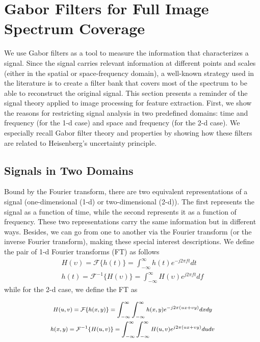 \documentclass[journal]{IEEEtran}
\begin{document}
\section{Gabor Filters for Full Image Spectrum Coverage}\label{sec:gabor_filter_description}
We use Gabor filters as a tool to measure the information that characterizes a signal. Since the signal carries relevant information at different points and scales (either in the spatial or space-frequency domain), a well-known strategy used in the literature is to create a filter bank that covers most of the spectrum to be able to reconstruct the original signal. This section presents a reminder of the signal theory applied to image processing for feature extraction. First, we show the reasons for restricting signal analysis in two predefined domains: time and frequency (for the 1-d case) and space and frequency (for the 2-d case). We especially recall Gabor filter theory and properties by showing how these filters are related to Heisenberg's uncertainty principle.

\subsection{Signals in Two Domains}
Bound by the Fourier transform, there are two equivalent representations of a signal (one-dimensional (1-d) or two-dimensional (2-d)). The first represents the signal as a function of time, while the second represents it as a function of frequency. These two representations carry the same information but in different ways. Besides, we can go from one to another via the Fourier transform (or the inverse Fourier transform), making these special interest descriptions. We define the pair of 1-d Fourier transforms (FT) as follows
\begin{equation}\label{eq:fourier_transforms_1d}
    \begin{gathered}
        H(\upsilon) = \mathcal{F}\{h(t)\} = \int_{-\infty}^{\infty} h(t) e^{-j2\pi f t} dt \\
        h(t) = \mathcal{F}^{-1}\{H(\upsilon)\} = \int_{-\infty}^{\infty} H(\upsilon) e^{j2\pi f t} df 
    \end{gathered}
\end{equation}
while for the 2-d case, we define the FT as

\begin{equation}\label{eq:fourier_transforms_2d}
    \begin{gathered}
        \medmath{H(u, v) = \mathcal{F}\{h(x, y)\} = \int_{-\infty}^{\infty} \int_{-\infty}^{\infty} h(x, y) e^{-j2\pi (ux + vy)} dx dy} \\
        \medmath{h(x, y) = \mathcal{F}^{-1}\{H(u, v)\} = \int_{-\infty}^{\infty} \int_{-\infty}^{\infty}  H(u, v) e^{j2\pi (ux + vy)} du dv} 
    \end{gathered}
\end{equation}
\end{document}
